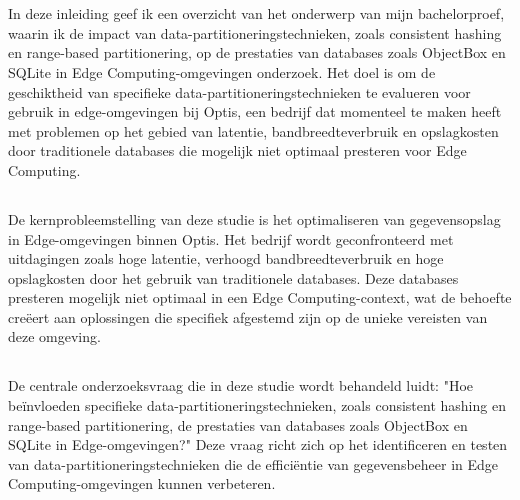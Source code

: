 \chapter{}%
\label{ch:inleiding}

In deze inleiding geef ik een overzicht van het onderwerp van mijn bachelorproef, waarin ik de impact van data-partitioneringstechnieken, zoals consistent hashing en range-based partitionering, op de prestaties van databases zoals ObjectBox en SQLite in Edge Computing-omgevingen onderzoek. Het doel is om de geschiktheid van specifieke data-partitioneringstechnieken te evalueren voor gebruik in edge-omgevingen bij Optis, een bedrijf dat momenteel te maken heeft met problemen op het gebied van latentie, bandbreedteverbruik en opslagkosten door traditionele databases die mogelijk niet optimaal presteren voor Edge Computing. 

\section{}%
\label{sec:probleemstelling}

De kernprobleemstelling van deze studie is het optimaliseren van gegevensopslag in Edge-omgevingen binnen Optis. Het bedrijf wordt geconfronteerd met uitdagingen zoals hoge latentie, verhoogd bandbreedteverbruik en hoge opslagkosten door het gebruik van traditionele databases. Deze databases presteren mogelijk niet optimaal in een Edge Computing-context, wat de behoefte creëert aan oplossingen die specifiek afgestemd zijn op de unieke vereisten van deze omgeving.

\section{}%
\label{sec:onderzoeksvraag}

De centrale onderzoeksvraag die in deze studie wordt behandeld luidt: 
"Hoe beïnvloeden specifieke data-partitioneringstechnieken, zoals consistent hashing en range-based partitionering, de prestaties van databases zoals ObjectBox en SQLite in Edge-omgevingen?" 
Deze vraag richt zich op het identificeren en testen van data-partitioneringstechnieken die de efficiëntie van gegevensbeheer in Edge Computing-omgevingen kunnen verbeteren.

\section{}%
\label{sec:onderzoeksdoelstelling}

